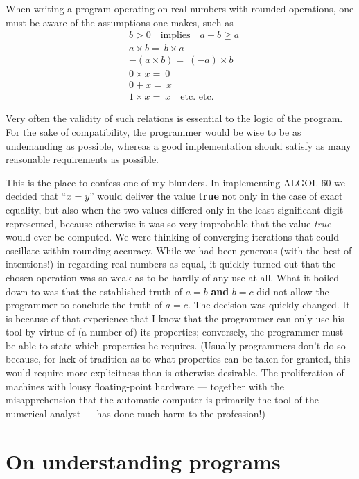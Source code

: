 When writing a program operating on real numbers with rounded operations, one must be aware of the assumptions one makes, such as
\begin{align*}
		&b > 0\quad \text{implies}\quad a + b \geqslant a\\
		&a\times b =\ b\times a\\
		&-(a \times  b) =\ (-a)\times b\\
		&0\times  x =\ 0\\
		&0 + x =\ x\\
		&1\times x =\ x\quad\text{etc. etc.}
\end{align*}


Very often the validity of such relations is essential to the logic of the program. For the sake of compatibility, the programmer would be wise to be as undemanding as possible, whereas a good implementation should satisfy as many reasonable requirements as possible.

This is the place to confess one of my blunders. In implementing ALGOL 60 we decided that ``$x = y$'' would deliver the value \textbf{true} not only in the case of exact equality, but also when the two values differed only in the least significant digit represented, because otherwise it was so very improbable that the value \textit{true} would ever be computed. We were thinking of converging iterations that could oscillate within rounding accuracy. While we had been generous (with the best of intentions!) in regarding real numbers as equal, it quickly turned out that the chosen operation was so weak as to be hardly of any use at all. What it boiled down to was that the established truth of $a = b$ \textbf{and} $b = c$ did not allow the programmer to conclude the truth of $a = c$. The decision was quickly changed. It is because of that experience that I know that the programmer can only use his tool by virtue of (a number of) its properties; conversely, the programmer must be able to state which properties he requires. (Usually programmers don't do so because, for lack of tradition as to what properties can be taken for granted, this would require more explicitness than is otherwise desirable. The proliferation of machines with lousy floating-point hardware --- together with the misapprehension that the automatic computer is primarily the tool of the numerical analyst --- has done much harm to the profession!)

\section{On understanding programs}
\label{sec:undertanding-programs}

